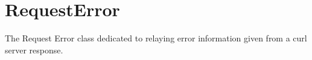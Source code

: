 \hypertarget{group__request__error__class}{}\section{Request\+Error}
\label{group__request__error__class}
The Request Error class dedicated to relaying error information given from a curl server response. 